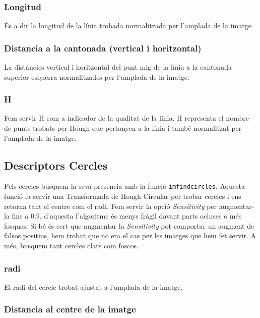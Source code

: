 \subsubsection{Longitud}

És a dir la longitud de la línia trobada normalitzada per l'amplada de la imatge.

\subsubsection{Distancia a la cantonada (vertical i horitzontal)}

La distàncies vertical i horitzontal del punt mig de la línia a la cantonada
superior esquerra normalitzades per l'amplada de la imatge.

\subsubsection{H}

Fem servir H com a indicador de la qualitat de la línia. H representa el nombre de
punts trobats per Hough que pertanyen a la línia i també normalitzat per l'amplada
de la imatge.


\subsection{Descriptors Cercles}

Pels cercles busquem la seva presencia amb la funció \texttt{imfindcircles}.
Aquesta funció fa servir una Transformada de Hough Circular per trobar cercles
i ens retorna tant el centre com el radi. Fem servir la opció \emph{Sensitivity}
per augmentar-la fins a $0.9$, d'aquesta l'algoritme és menys fràgil davant
parts ocluses o més fosques. Si bé és cert que augmentar la \emph{Sensitivity}
pot comportar un augment de falsos positius, hem trobat que no era el cas per
les imatges que hem fet servir. A més, busquem tant cercles clars com foscos.

\subsubsection{radi}

El radi del cercle trobat ajustat a l'amplada de la imatge.

\subsubsection{Distancia al centre de la imatge}

